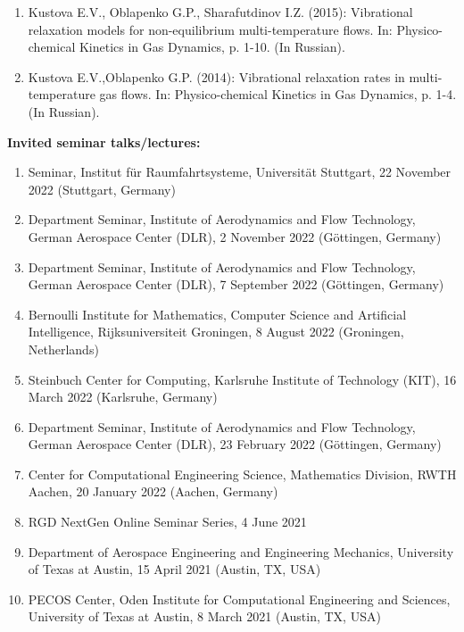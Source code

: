 \documentclass{resume} %
\begin{document}
\begin{enumerate}
    \item  {Kustova E.V., {Oblapenko G.P.}, Sharafutdinov I.Z.} (2015):  {Vibrational relaxation models for non-equilibrium multi-temperature flows}. In: Physico-chemical Kinetics in Gas Dynamics, p. 1-10. (In Russian).

    \item  {Kustova E.V.,{Oblapenko G.P.}} (2014): {Vibrational relaxation rates in multi-temperature gas flows.} In: Physico-chemical Kinetics in Gas Dynamics, p. 1-4. (In Russian).
\end{enumerate}


{\bf Invited seminar talks/lectures:}
\begin{enumerate}
    \item Seminar, Institut f\"{u}r Raumfahrtsysteme, Universit\"{a}t Stuttgart, 22 November 2022 (Stuttgart, Germany)
    \item Department Seminar, Institute of Aerodynamics and Flow Technology, German Aerospace Center (DLR), 2 November 2022 (G\"{o}ttingen, Germany)
    \item Department Seminar, Institute of Aerodynamics and Flow Technology, German Aerospace Center (DLR), 7 September 2022 (G\"{o}ttingen, Germany)
    \item Bernoulli Institute for Mathematics, Computer Science and Artificial Intelligence, Rijksuniversiteit Groningen, 8 August 2022 (Groningen, Netherlands)
    \item Steinbuch Center for Computing, Karlsruhe Institute of Technology (KIT), 16 March 2022 (Karlsruhe, Germany)
    \item Department Seminar, Institute of Aerodynamics and Flow Technology, German Aerospace Center (DLR), 23 February 2022 (G\"{o}ttingen, Germany)
    \item Center for Computational Engineering Science, Mathematics Division, RWTH Aachen, 20 January 2022 (Aachen, Germany)
    \item RGD NextGen Online Seminar Series, 4 June 2021
    \item Department of Aerospace Engineering and Engineering Mechanics, University of Texas at Austin, 15 April 2021 (Austin, TX, USA)
    \item PECOS Center, Oden Institute for Computational Engineering and Sciences, University of Texas at Austin, 8 March 2021 (Austin, TX, USA)

\end{enumerate}
\end{document}
